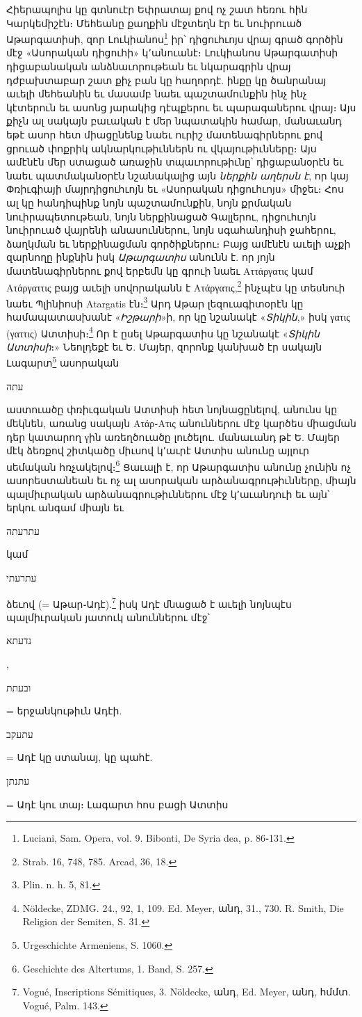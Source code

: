 \documentclass{article}
\begin{document}
{Հիերապոլիս կը գտնուէր Եփրատայ քով ոչ շատ հեռու հին Կարկեմիշէն։ Մեհեանը քաղքին մէջտեղն էր եւ նուիրուած Աթարգատիսի, զոր Լուկիանոս\footnote{Luciani, Sam. Opera, vol. 9. Bibonti, De Syria dea, p. 86֊131.} իր՝ դիցուհւոյս վրայ գրած գործին մէջ «Ասորական դիցուհի» կ՚անուանէ։ Լուկիանոս Աթարգատիսի դիցաբանական անձնաւորութեան եւ նկարագրին վրայ դժբախտաբար շատ քիչ բան կը հաղորդէ. ինքը կը ծանրանայ աւելի մեհեանին եւ մասամբ նաեւ պաշտամունքին ինչ ինչ կէտերուն եւ ասոնց յարակից դէպքերու եւ պարագաներու վրայ։ Այս քիչն ալ սակայն բաւական է մեր նպատակին համար, մանաւանդ եթէ ասոր հետ միացընենք նաեւ ուրիշ մատենագիրներու քով ցրուած փոքրիկ ակնարկութիւններն ու վկայութիւնները։ Այս ամէնէն մեր ստացած առաջին տպաւորութիւնը՝ դիցաբանօրէն եւ նաեւ պատմականօրէն նշանակալից այն \emph{ներքին աղերսն է}, որ կայ Փռիւգիայի մայրդիցուհւոյն եւ «Ասորական դիցուհւոյս» միջեւ։ Հոս ալ կը հանդիպինք նոյն պաշտամունքին, նոյն քրմական նուիրապետութեան, նոյն ներքինացած Գալլերու, դիցուհւոյն նուիրուած վայրենի անասուններու, նոյն սգահանդիսի ջահերու, ձաղկման եւ ներքինացման գործիքներու։ Բայց ամէնէն աւելի աչքի զարնողը ինքնին իսկ \emph{Աթարգատիս} անունն է. որ յոյն մատենագիրներու քով երբեմն կը գրուի նաեւ Αττάργατις կամ Ατάργαττις բայց աւելի սովորականն է Ατάργατις,\footnote{Strab. 16, 748, 785. Arcad, 36, 18.} ինչպէս կը տեսնուի նաեւ Պլինիոսի Atargatis էն։\footnote{Plin. n. h. 5, 81.} Արդ Աթար լեզուագիտօրէն կը համապատասխանէ «\emph{Իշթարի}»ի, որ կը նշանակէ «\emph{Տիկին},» իսկ γατις (γαττις) Ատտիսի։\footnote{Nöldecke, ZDMG. 24., 92, 1, 109. Ed. Meyer, անդ, 31., 730. R. Smith, Die Religion der Semiten, S. 31.} Որ է ըսել Աթարգատիս կը նշանակէ «\emph{Տիկին Ատտիսի}։» Նեոլդեքէ եւ Ե. Մայեր, զորոնք կանխած էր սակայն Լագարտ\footnote{Urgeschichte Armeniens, S. 1060.} ասորական \begin{hebrewfont}עתה\end{hebrewfont} աստուածը փռիւգական Ատտիսի հետ նոյնացընելով, անունս կը մեկնեն, առանց սակայն Ατάρ֊Ατις անուններու մէջ կարծես միացման դեր կատարող γին առեղծուածը լուծելու. մանաւանդ թէ Ե. Մայեր մէկ ձեռքով շիտկածը միւսով կ՚աւրէ Ատտիս անունը այլուր սեմական հռչակելով։\footnote{Geschichte des Altertums, 1. Band, S. 257.} Ցաւալի է, որ Աթարգատիս անունը չունին ոչ ասորեստանեան եւ ոչ ալ ասորական արձանագրութիւնները, միայն պալմիւրական արձանագրութիւններու մէջ կ՚աւանդուի եւ այն՝ երկու անգամ միայն եւ \begin{hebrewfont}עתרעתה\end{hebrewfont} կամ \begin{hebrewfont}עתרעתי\end{hebrewfont} ձեւով (= Աթար֊Ադէ).\footnote{Vogué, Inscriptions Sémitiques, 3. Nöldecke, անդ, Ed. Meyer, անդ, հմմտ. Vogué, Palm. 143.} իսկ Ադէ մնացած է աւելի նոյնպէս պալմիւրական յատուկ անուններու մէջ՝ \begin{hebrewfont}נדעתא\end{hebrewfont}, \begin{hebrewfont}ובעתת\end{hebrewfont} = երջանկութիւն Ադէի. \begin{hebrewfont}עתעקב\end{hebrewfont} = Ադէ կը ստանայ, կը պահէ. \begin{hebrewfont}עתנתן\end{hebrewfont} = Ադէ կու տայ։ Լագարտ հոս բացի Ատտիս }
\end{document}
